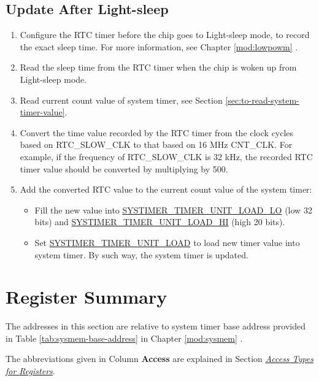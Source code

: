 \documentclass[main\_\_EN.tex]{subfiles}
\begin{document}
\subsection{Update After Light-sleep}
\begin{enumerate}
    \item Configure the RTC timer before the chip goes to Light-sleep mode, to record the exact sleep time. For more information, see Chapter \ref{mod:lowpowm} \textit{}.
    \item Read the sleep time from the RTC timer when the chip is woken up from Light-sleep mode.
    \item Read current count value of system timer, see Section \ref{sec:to-read-system-timer-value}.
    \item Convert the time value recorded by the RTC timer from the clock cycles based on RTC\_SLOW\_CLK to that based on 16 MHz CNT\_CLK. For example, if the frequency of RTC\_SLOW\_CLK is 32 kHz, the recorded RTC timer value should be converted by multiplying by 500.
    \item Add the converted RTC value to the current count value of the system timer:
    \begin{itemize}
        \item Fill the new value into \hyperref[fielddesc:SYSTIMERTIMERUNIT0LOADLO]{SYSTIMER\_TIMER\_UNIT\_LOAD\_LO} (low 32 bits) and \hyperref[fielddesc:SYSTIMERTIMERUNIT0LOADHI]{SYSTIMER\_TIMER\_UNIT\_LOAD\_HI} (high 20 bits).
        \item Set \hyperref[fielddesc:SYSTIMERTIMERUNIT0LOAD]{SYSTIMER\_TIMER\_UNIT\_LOAD} to load new timer value into system timer. By such way, the system timer is updated.    \end{itemize}
\end{enumerate}



\clearpage
\hypertarget{systimer-summ}{}
\section{Register Summary}
\label{sec:28-systimer-reg-summ}

The addresses in this section are relative to system timer base address provided in Table \ref{tab:sysmem-base-address} in Chapter \ref{mod:sysmem} \textit{}.

The abbreviations given in Column \textbf{Access} are explained in Section \hyperref[glossary-access-types]{\textit{Access Types for Registers}}.
\end{document}
